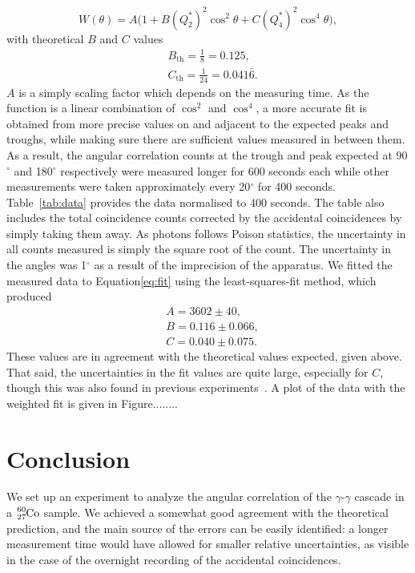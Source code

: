 \documentclass[twocolumn]{article}
\begin{document}
\begin{equation}
W(\theta) = A \big(1 + B (Q^{*}_2)^2 \cos^2 \theta + C (Q^{*}_4)^2 \cos^4 \theta \big), \label{eq:fit}
\end{equation} 
with theoretical $B$ and $C$ values
\begin{align*}
&B_{\text{th}} = \frac{1}{8} = 0.125,\\
&C_{\text{th}} = \frac{1}{24} = 0.041\bar{6}.
\end{align*}
$A$ is a simply scaling factor which depends on the measuring time. As the function is a linear combination of $\cos^2$ and $\cos^4$, a more accurate fit is obtained from more precise values on and adjacent to the expected peaks and troughs, while making sure there are sufficient values measured in between them. As a result, the angular correlation counts at the trough and peak expected at 90$^{\circ}$ and 180$^{\circ}$ respectively were measured longer for 600 seconds each while other measurements were taken approximately every 20$^{\circ}$ for 400 seconds. Table~\ref{tab:data} provides the data normalised to 400 seconds. The table also includes the total coincidence counts corrected by the accidental coincidences by simply taking them away. As photons follows Poison statistics, the uncertainty in all counts measured is simply the square root of the count. The uncertainty in the angles was 1$^\circ$ as a result of the imprecision of the apparatus. We fitted the measured data to Equation\ref{eq:fit} using the least-squares-fit method, which produced
\begin{align*}
&A = 3602 \pm 40,\\
&B = 0.116  \pm 0.066,\\
&C = 0.040 \pm 0.075.
\end{align*}
These values are in agreement with the theoretical values expected, given above. That said, the uncertainties in the fit values are quite large, especially for $C$, though this was also found in previous experiments~\cite{meliss}. A plot of the data with the weighted fit is given in Figure........


\section{Conclusion}
We set up an experiment to analyze the angular correlation of the $\gamma$-$\gamma$ cascade in a $\ce{_27^{60}Co}$ sample. We achieved a somewhat good agreement with the theoretical prediction, and the main source of the errors can be easily identified: a longer measurement time would have allowed for smaller relative uncertainties, as visible in the case of the overnight recording of the accidental coincidences.
\end{document}
